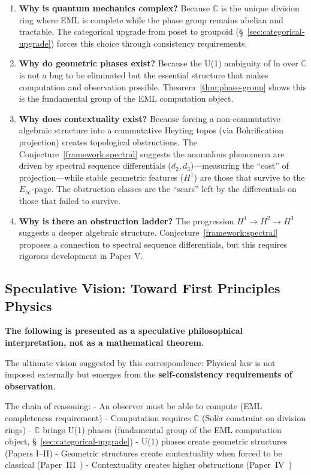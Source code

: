 \documentclass[11pt]{article}
\begin{document}
\begin{enumerate}
\def\labelenumi{\arabic{enumi}.}
\item
  \textbf{Why is quantum mechanics complex?} Because $\mathbb{C}$ is the unique division ring where EML is complete while the phase group remains abelian and tractable. The categorical upgrade from poset to groupoid (\S~\ref{sec:categorical-upgrade}) forces this choice through consistency requirements.
\item
  \textbf{Why do geometric phases exist?} Because the U(1) ambiguity of ln over $\mathbb{C}$ is not a bug to be eliminated but the essential structure that makes computation and observation possible. Theorem~\ref{thm:phase-group} shows this is the fundamental group of the EML computation object.
\item
  \textbf{Why does contextuality exist?} Because forcing a non-commutative algebraic structure into a commutative Heyting topos (via Bohrification projection) creates topological obstructions. The Conjecture~\ref{framework:spectral} suggests the anomalous phenomena are driven by spectral sequence differentials ($d_2, d_3$)---measuring the ``cost'' of projection---while stable geometric features ($H^1$) are those that survive to the $E_\infty$-page. The obstruction classes are the ``scars'' left by the differentials on those that failed to survive.
\item
  \textbf{Why is there an obstruction ladder?} The progression \(H^1 \to H^2 \to H^3\) suggests a deeper algebraic structure. Conjecture~\ref{framework:spectral} proposes a connection to spectral sequence differentials, but this requires rigorous development in Paper V.
\end{enumerate}

\subsection{Speculative Vision: Toward First Principles Physics}
\label{speculative-vision-toward-first-principles-physics}

\textbf{The following is presented as a speculative philosophical interpretation, not as a mathematical theorem.}

The ultimate vision suggested by this correspondence: Physical law is not imposed externally but emerges from the \textbf{self-consistency requirements of observation}.

The chain of reasoning: - An observer must be able to compute (EML completeness requirement) - Computation requires $\mathbb{C}$ (Solèr constraint on division rings) - $\mathbb{C}$ brings U(1) phases (fundamental group of the EML computation object, \S~\ref{sec:categorical-upgrade}) - U(1) phases create geometric structures (Papers I--II) - Geometric structures create contextuality when forced to be classical (Paper~III~\cite{PaperIII}) - Contextuality creates higher obstructions (Paper~IV~\cite{PaperIV})
\end{document}
